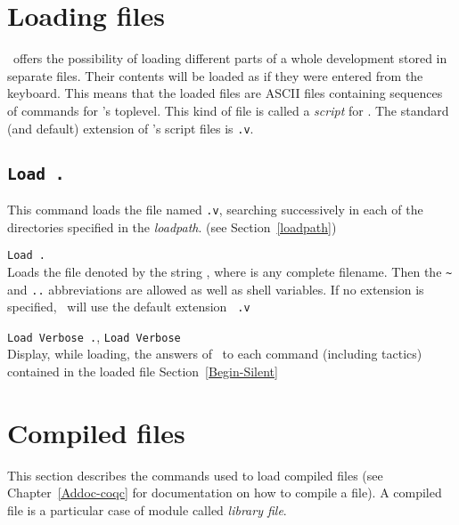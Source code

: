 \section{Loading files}

\Coq\ offers the possibility of loading different
parts of a whole development stored in separate files. Their contents
will be loaded as if they were entered from the keyboard. This means
that the loaded files are ASCII files containing sequences of commands
for \Coq's toplevel. This kind of file is called a {\em script} for
\Coq{}. The standard (and default) extension of
\Coq's script files is {\tt .v}.

\subsection[\tt Load {\ident}.]{\tt Load {\ident}.\label{Load}}
This command loads the file named {\ident}{\tt .v}, searching
successively in each of the directories specified in the {\em
  loadpath}. (see Section~\ref{loadpath})

\begin{Variants}
\item {\tt Load {\str}.}\label{Load-str}\\
  Loads the file denoted by the string {\str}, where {\str} is any
  complete filename. Then the \verb.~. and {\tt ..}
  abbreviations are allowed as well as shell variables. If no
  extension is specified, \Coq\ will use the default extension {\tt
    .v}
\item {\tt Load Verbose {\ident}.}, 
  {\tt Load Verbose {\str}}\\
  Display, while loading, the answers of \Coq\ to each command
  (including tactics) contained in the loaded file
  \SeeAlso Section~\ref{Begin-Silent}
\end{Variants}

\begin{ErrMsgs}
\item {}
\end{ErrMsgs}

\section[Compiled files]{Compiled files\label{compiled}}

This section describes the commands used to load compiled files (see
Chapter~\ref{Addoc-coqc} for documentation on how to compile a file).
A compiled file is a particular case of module called {\em library file}.

